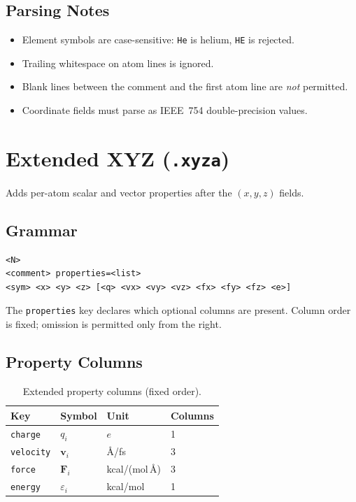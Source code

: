 \documentclass[12pt, a4paper, oneside]{article}
\begin{document}
\subsection{Parsing Notes}

\begin{itemize}
  \item Element symbols are case-sensitive: \texttt{He} is helium, \texttt{HE} is rejected.
  \item Trailing whitespace on atom lines is ignored.
  \item Blank lines between the comment and the first atom line are \emph{not} permitted.
  \item Coordinate fields must parse as IEEE~754 double-precision values.
\end{itemize}

\section{Extended XYZ (\texttt{.xyza})}
\label{sec:xyza}

Adds per-atom scalar and vector properties after the $(x, y, z)$ fields.

\subsection{Grammar}

\begin{lstlisting}[language={},frame=single]
<N>
<comment> properties=<list>
<sym> <x> <y> <z> [<q> <vx> <vy> <vz> <fx> <fy> <fz> <e>]
\end{lstlisting}

The \texttt{properties} key declares which optional columns are present.
Column order is fixed; omission is permitted only from the right.

\subsection{Property Columns}

\begin{table}[htbp]
  \centering
  \caption{Extended property columns (fixed order).}
  \label{tab:xyza_cols}
  \begin{tabular}{llll}
    \toprule
    Key & Symbol & Unit & Columns \\
    \midrule
    \texttt{charge}   & $q_i$          & $e$                   & 1 \\
    \texttt{velocity} & $\mathbf{v}_i$ & \AA/fs                & 3 \\
    \texttt{force}    & $\mathbf{F}_i$ & kcal/(mol\,\AA)       & 3 \\
    \texttt{energy}   & $\varepsilon_i$& kcal/mol              & 1 \\
    \bottomrule
  \end{tabular}
\end{table}
\end{document}
